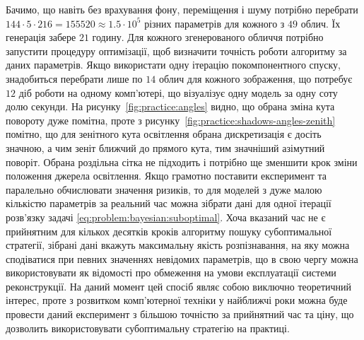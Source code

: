 Бачимо, що навіть без врахування фону, переміщення і шуму потрібно перебрати
$144 \cdot 5 \cdot 216 = 155520 \approx 1.5 \cdot 10^{5}$ різних параметрів
для кожного з $49$ облич.
Їх генерація забере $21$ годину.
Для кожного згенерованого обличчя потрібно запустити процедуру оптимізації,
щоб визначити точність роботи алгоритму за даних параметрів.
Якщо використати одну ітерацію покомпонентного спуску,
знадобиться перебрати лише по $14$ облич для кожного зображення,
що потребує $12$ діб роботи на одному комп'ютері,
що візуалізує одну модель за одну соту долю секунди.
На рисунку~\ref{fig:practice:angles} видно,
що обрана зміна кута повороту дуже помітна,
проте з рисунку~\ref{fig:practice:shadows-angles-zenith} помітно,
що для зенітного кута освітлення
обрана дискретизація є досіть значною,
а чим зеніт ближчий до прямого кута,
тим значніший азімутний поворіт.
Обрана роздільна сітка не підходить
і потрібно ще зменшити крок зміни положення джерела освітлення.
Якщо грамотно поставити експеримент та паралельно обчислювати значення ризиків,
то для моделей з дуже малою кількістю параметрів за реальний час можна зібрати дані
для одної ітерації розв'язку задачі \eqref{eq:problem:bayesian:suboptimal}.
Хоча вказаний час не є прийнятним для кількох десятків кроків
алгоритму пошуку субоптимальної стратегії,
зібрані дані вкажуть максимальну якість розпізнавання,
на яку можна сподіватися при певних значеннях невідомих параметрів,
що в свою чергу можна використовувати як
відомості про обмеження на умови експлуатації системи реконструкції.
На даний момент цей спосіб являє собою виключно теоретичний інтерес,
проте з розвитком комп'ютерної техніки у найближчі роки можна буде
провести даний експеримент з більшою точністю за прийнятний час та ціну,
що дозволить використовувати субоптимальну стратегію на практиці.
